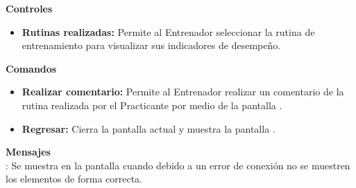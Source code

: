 \textbf{\textcolor[rgb]{0, 0, 0.545098}{Controles}}
\begin{itemize}
	\item \textbf{\textcolor[rgb]{0, 0, 0.545098}{Rutinas realizadas:}} Permite al Entrenador seleccionar la rutina de entrenamiento para visualizar sus indicadores de desempeño.
\end{itemize}
\vspace{1em}

\textbf{\textcolor[rgb]{0, 0, 0.545098}{Comandos}}
\begin{itemize}
	\item \textbf{\textcolor[rgb]{0, 0, 0.545098}{Realizar comentario:}} Permite al Entrenador realizar un comentario de la rutina realizada por el Practicante por medio de la pantalla .
	\item \textbf{\textcolor[rgb]{0, 0, 0.545098}{Regresar:}} Cierra la pantalla actual y muestra la pantalla .
\end{itemize}

\vspace{1em}

\textbf{\textcolor[rgb]{0, 0, 0.545098}{Mensajes}}\\
	
\textbf{}: Se muestra en la pantalla  cuando debido a un error de conexión no se muestren los elementos de forma correcta.\\

\clearpage